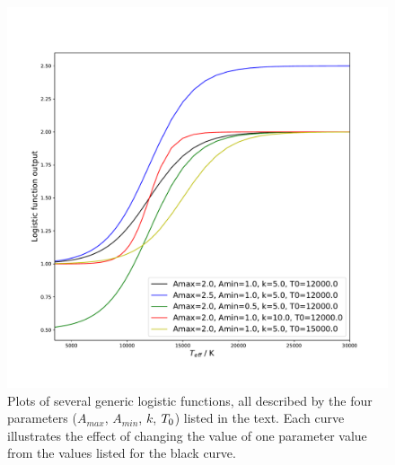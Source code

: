 \documentclass[12pt, a4paper]{report}
\begin{document}
\begin{figure}[h!]
\begin{center}
\includegraphics[width=1.0\textwidth]{generic_logistic_params_illustration.pdf}
\caption{Plots of several generic logistic functions, all described by the four parameters ($A_{max}$, $A_{min}$, $k$, $T_{\textnormal{0}}$) listed in the text. Each curve illustrates the effect of changing the value of one parameter value from the values listed for the black curve.}
\label{logistic_curve_example}
\end{center}
\end{figure}
\end{document}
